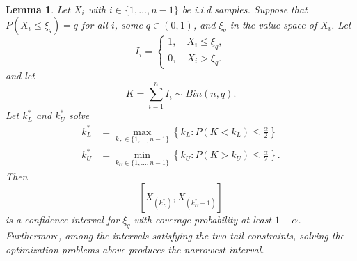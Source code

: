 \documentclass{article}
\newtheorem{lemma}{Lemma}
\begin{document}
\begin{lemma}\label{lemma:quantile_CI}
Let $X_i$ with $i\in\{1,\ldots,n-1\}$ be i.i.d samples. Suppose that $P(X_i\leq \xi_q)=q$ for all $i$, some $q\in(0,1)$, and $\xi_q$ in the value space of $X_i$. Let
$$I_i =
\begin{cases}
1,\quad X_i\leq\xi_q,\\
0,\quad X_i>\xi_q.
\end{cases}$$
and let
$$K=\sum_{i=1}^n I_i\sim Bin(n,q).$$
Let $k_L^*$ and $k_U^*$ solve
$$
\begin{aligned}
k_L^*
&=
\max_{k_L\in\{1,\ldots,n-1\}}
\left\{
k_L:
P(K<k_L)\leq\frac{\alpha}{2}
\right\}\\
k_U^*
&=
\min_{k_U\in\{1,\ldots,n-1\}}
\left\{
k_U:
P(K>k_U)\leq\frac{\alpha}{2}
\right\}.
\end{aligned}
$$
Then
$$[X_{(k_L^*)},X_{(k_U^*+1)}]$$
is a confidence interval for $\xi_q$ with coverage probability at least $1-\alpha$. Furthermore, among the intervals satisfying the two tail constraints, solving the optimization problems above produces the narrowest interval.
\end{lemma}
\end{document}
